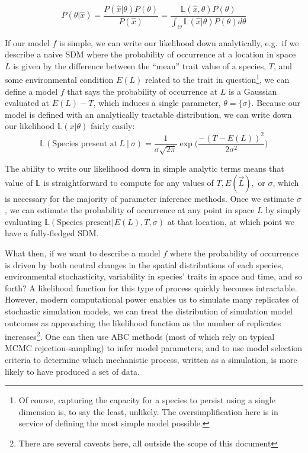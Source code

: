 \documentclass[]{article}
\begin{document}
\[ P(\theta | \hat{x}) = \frac{P(\hat{x} | \theta)  P(\theta)}{P(\hat{x})} = \frac{\mathbb{L}(\hat{x}, \theta)  P(\theta)}{\int_\Theta \mathbb{L}(\hat{x} | \theta) P(\theta) d\theta}\]

If our model \(f\) is simple, we can write our likelihood down
analytically, e.g.~if we describe a naive SDM where the probability of
occurrence at a location in space \(L\) is given by the difference
between the ``mean'' trait value of a species, \(T\), and some
environmental condition \(E({L})\) related to the trait in
question\footnote{Of course, capturing the capacity for a species to
  persist using a single dimension is, to say the least, unlikely. The
  oversimplification here is in service of defining the most simple
  model possible.}, we can define a model \(f\) that says the
probability of occurrence at \({L}\) is a Gaussian evaluated at
\(E({L}) - T\), which induces a single parameter,
\(\theta = \{ \sigma \}\). Because our model is defined with an
analytically tractable distribution, we can write down our likelihood
\(\mathbb{L}(x | \theta)\) fairly easily:
\[\mathbb{L}(\text{Species present at} \ {L} \ |\  \sigma) = \frac{1}{\sigma \sqrt{2\pi}} \exp \Big( \frac{-(T-E({L}))^2}{2\sigma^2} \Big)\]

The ability to write our likelihood down in simple analytic terms means
that value of \(\mathbb{L}\) is straightforward to compute for any
values of \(T, E(\vec{L}),\) or \(\sigma\), which is necessary for the
majority of parameter inference methods. Once we estimate \(\sigma\), we
can estimate the probability of occurrence at any point in space \(L\)
by simply evaluating
\(\mathbb{L}(\text{Species present} | E(L) , T, \sigma)\) at that
location, at which point we have a fully-fledged SDM.

What then, if we want to describe a model \(f\) where the probability of
occurrence is driven by both neutral changes in the spatial
distributions of each species, environmental stochasticity, variability
in species' traits in space and time, and so forth? A likelihood
function for this type of process quickly becomes intractable. However,
modern computational power enables us to simulate many replicates of
stochastic simulation models, we can treat the distribution of
simulation model outcomes as approaching the likelihood function as the
number of replicates increases\footnote{There are several caveats here,
  all outside the scope of this document}. One can then use ABC methods
(most of which rely on typical MCMC rejection-sampling) to infer model
parameters, and to use model selection criteria to determine which
mechanistic process, written as a simulation, is more likely to have
produced a set of data.
\end{document}
